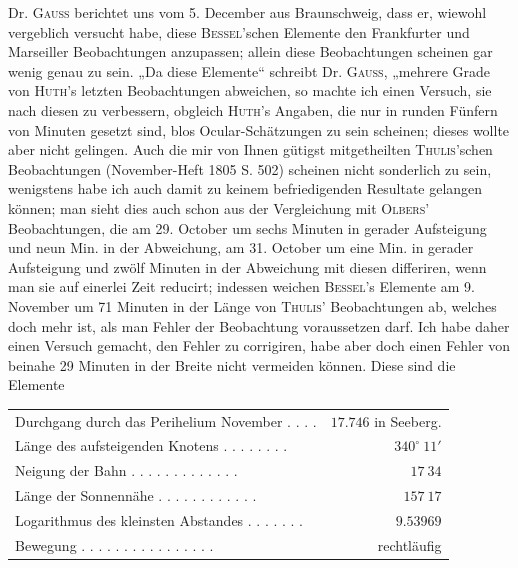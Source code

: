 Dr. \textsc{Gauss} berichtet uns vom 5. December aus Braunschweig, dass er, wiewohl vergeblich versucht habe, diese \textsc{Bessel}'schen Elemente den Frankfurter und Marseiller Beobachtungen anzupassen; allein diese Beobachtungen scheinen gar wenig genau zu sein. „Da diese Elemente“ schreibt Dr. \textsc{Gauss}, „mehrere Grade von \textsc{Huth}'s letzten Beobachtungen abweichen, so machte ich einen Versuch, sie nach diesen zu verbessern, obgleich \textsc{Huth}'s Angaben, die nur in runden Fünfern von Minuten gesetzt sind, blos Ocular-Schätzungen zu sein scheinen; dieses wollte aber nicht gelingen. Auch die mir von Ihnen gütigst mitgetheilten \textsc{Thulis}'schen Beobachtungen (November-Heft 1805 S. 502) scheinen nicht sonderlich zu sein, wenigstens habe ich auch damit zu keinem befriedigenden Resultate gelangen können; man sieht dies auch schon aus der Vergleichung mit \textsc{Olbers}' Beobachtungen, die am 29. October um sechs Minuten in gerader Aufsteigung und neun Min. in der Abweichung, am 31. October um eine Min. in gerader Aufsteigung und zwölf Minuten in der Abweichung mit diesen differiren, wenn man sie auf einerlei Zeit reducirt; indessen weichen \textsc{Bessel}'s Elemente am 9. November um 71 Minuten in der Länge von \textsc{Thulis}' Beobachtungen ab, welches doch mehr ist, als man Fehler der Beobachtung voraussetzen darf. Ich habe daher einen Versuch gemacht, den Fehler zu corrigiren, habe aber doch einen Fehler von beinahe 29 Minuten in der Breite nicht vermeiden können. Diese sind die Elemente

\begin{center}
\begingroup\fontsize{8}{10}\selectfont\setlength{\tabcolsep}{3pt}\renewcommand{\arraystretch}{1.1}
\begin{tabular}{lr}
Durchgang durch das Perihelium November . . . . & $17.746$ in Seeberg. \\
Länge des aufsteigenden Knotens . . . . . . . . & $340^\circ\ 11'$ \\
Neigung der Bahn . . . . . . . . . . . . . & $17\ 34$ \\
Länge der Sonnennähe . . . . . . . . . . . . & $157\ 17$ \\
Logarithmus des kleinsten Abstandes . . . . . . . & $9.53969$ \\
Bewegung . . . . . . . . . . . . . . . . & rechtläufig \\
\end{tabular}\endgroup
\end{center}

